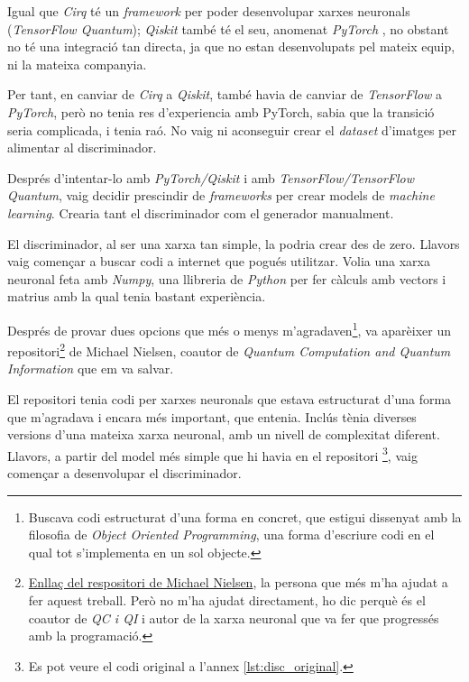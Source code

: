 Igual que \textit{Cirq} té un \textit{framework} per poder desenvolupar xarxes neuronals (\textit{TensorFlow Quantum}); \textit{Qiskit} també té el seu, anomenat \textit{PyTorch} \cite{pytorch_2019}, no obstant no té una integració tan directa, ja que no estan desenvolupats pel mateix equip, ni la mateixa companyia.

Per tant, en canviar de \textit{Cirq} a \textit{Qiskit}, també havia de canviar de \textit{TensorFlow} a \textit{PyTorch}, però no tenia res d'experiencia amb PyTorch, sabia que la transició seria complicada, i tenia raó. No vaig ni aconseguir crear el \textit{dataset} d'imatges per alimentar al discriminador.

Després d'intentar-lo amb \textit{PyTorch/Qiskit} i amb \textit{TensorFlow/TensorFlow Quantum}, vaig decidir prescindir de \textit{frameworks} per crear models de \textit{machine learning}. Crearia tant el discriminador com el generador manualment. 

El discriminador, al ser una xarxa tan simple, la podria crear des de zero. Llavors vaig començar a buscar codi a internet que pogués utilitzar. Volia una xarxa neuronal feta amb \textit{Numpy}, una llibreria de \textit{Python} per fer càlculs amb vectors i matrius amb la qual tenia bastant experiència.

Després de provar dues opcions que més o menys m'agradaven\footnote{Buscava codi estructurat d'una forma en concret, que estigui dissenyat amb la filosofia de \textit{Object Oriented Programming}, una forma d'escriure codi en el qual tot s'implementa en un sol objecte.}, va aparèixer un repositori\footnote{\href{https://github.com/mnielsen/neural-networks-and-deep-learning}{Enllaç del respositori de Michael Nielsen}, la persona que més m'ha ajudat a fer aquest treball. Però no m'ha ajudat directament, ho dic perquè és el coautor de \textit{QC i QI} \cite{QCandQI} i autor de la xarxa neuronal que va fer que progressés amb la programació. } de Michael Nielsen, coautor de \textit{Quantum Computation and Quantum Information} \cite{QCandQI} que em va salvar. 

El repositori tenia codi per xarxes neuronals que estava estructurat d'una forma que m'agradava i encara més important, que entenia. Inclús tènia diverses versions d'una mateixa xarxa neuronal, amb un nivell de complexitat diferent. Llavors, a partir del model més simple que hi havia en el repositori \footnote{Es pot veure el codi original a l'annex \ref{lst:disc_original}.}, vaig començar a desenvolupar el discriminador.

